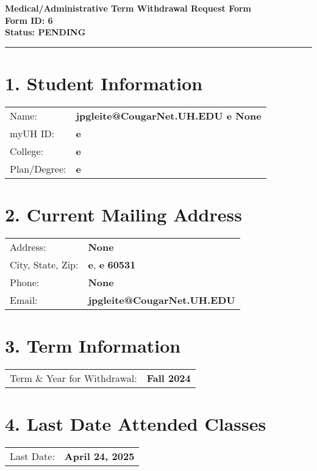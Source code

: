 \documentclass[12pt]{article}
\begin{document}
\begin{center}
  \textbf{\Large Medical/Administrative Term Withdrawal Request Form}\\[0.2cm]
  \textbf{Form ID: 6}\\[0.2cm]
  \textbf{Status: PENDING}
\end{center}

\hrule
\vspace{0.5cm}

\section*{1. Student Information}
\begin{tabular}{ll}
Name: & \textbf{jpgleite@CougarNet.UH.EDU e None} \\
myUH ID: & \textbf{e} \\
College: & \textbf{e} \\
Plan/Degree: & \textbf{e} \\
\end{tabular}

\vspace{0.5cm}

\section*{2. Current Mailing Address}
\begin{tabular}{ll}
Address: & \textbf{None} \\
City, State, Zip: & \textbf{e}, \textbf{e} \textbf{60531} \\
Phone: & \textbf{None} \\
Email: & \textbf{jpgleite@CougarNet.UH.EDU} \\
\end{tabular}

\vspace{0.5cm}

\section*{3. Term Information}
\begin{tabular}{ll}
Term \& Year for Withdrawal: & \textbf{Fall 2024} \\
\end{tabular}

\vspace{0.5cm}

\section*{4. Last Date Attended Classes}
\begin{tabular}{ll}
Last Date: & \textbf{April 24, 2025} \\
\end{tabular}
\end{document}
